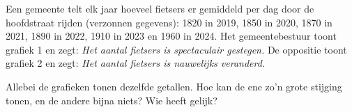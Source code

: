 %


\begin{probleem}
Een gemeente telt elk jaar hoeveel fietsers er gemiddeld per dag door de hoofdstraat rijden (verzonnen gegevens): 1820 in 2019, 1850 in 2020, 1870 in 2021, 1890 in 2022, 1910 in 2023 en 1960 in 2024. Het gemeentebestuur toont grafiek 1 en zegt: \textit{Het aantal fietsers is spectaculair gestegen.} De oppositie toont grafiek 2 en zegt: \textit{Het aantal fietsers is nauwelijks veranderd.}


Allebei de grafieken tonen dezelfde getallen. Hoe kan de ene zo'n grote stijging tonen, en de andere bijna niets? Wie heeft gelijk?
\end{probleem}

